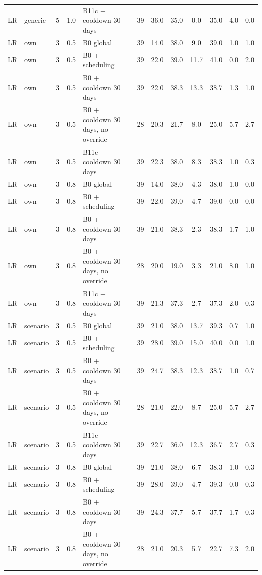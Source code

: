 \documentclass[10pt,onecolumn,letterpaper]{article}
\begin{document}
\begin{longtable}{lllllccccccc}
LR & generic & 5 & 1.0 & B11c + cooldown 30 days & 39 & 36.0 & 35.0 & 0.0 & 35.0 & 4.0 & 0.0 \\
LR & own & 3 & 0.5 & B0 global & 39 & 14.0 & 38.0 & 9.0 & 39.0 & 1.0 & 1.0 \\
LR & own & 3 & 0.5 & B0 + scheduling & 39 & 22.0 & 39.0 & 11.7 & 41.0 & 0.0 & 2.0 \\
LR & own & 3 & 0.5 & B0 + cooldown 30 days & 39 & 22.0 & 38.3 & 13.3 & 38.7 & 1.3 & 1.0 \\
LR & own & 3 & 0.5 & B0 + cooldown 30 days, no override & 28 & 20.3 & 21.7 & 8.0 & 25.0 & 5.7 & 2.7 \\
LR & own & 3 & 0.5 & B11c + cooldown 30 days & 39 & 22.3 & 38.0 & 8.3 & 38.3 & 1.0 & 0.3 \\
LR & own & 3 & 0.8 & B0 global & 39 & 14.0 & 38.0 & 4.3 & 38.0 & 1.0 & 0.0 \\
LR & own & 3 & 0.8 & B0 + scheduling & 39 & 22.0 & 39.0 & 4.7 & 39.0 & 0.0 & 0.0 \\
LR & own & 3 & 0.8 & B0 + cooldown 30 days & 39 & 21.0 & 38.3 & 2.3 & 38.3 & 1.7 & 1.0 \\
LR & own & 3 & 0.8 & B0 + cooldown 30 days, no override & 28 & 20.0 & 19.0 & 3.3 & 21.0 & 8.0 & 1.0 \\
LR & own & 3 & 0.8 & B11c + cooldown 30 days & 39 & 21.3 & 37.3 & 2.7 & 37.3 & 2.0 & 0.3 \\
LR & scenario & 3 & 0.5 & B0 global & 39 & 21.0 & 38.0 & 13.7 & 39.3 & 0.7 & 1.0 \\
LR & scenario & 3 & 0.5 & B0 + scheduling & 39 & 28.0 & 39.0 & 15.0 & 40.0 & 0.0 & 1.0 \\
LR & scenario & 3 & 0.5 & B0 + cooldown 30 days & 39 & 24.7 & 38.3 & 12.3 & 38.7 & 1.0 & 0.7 \\
LR & scenario & 3 & 0.5 & B0 + cooldown 30 days, no override & 28 & 21.0 & 22.0 & 8.7 & 25.0 & 5.7 & 2.7 \\
LR & scenario & 3 & 0.5 & B11c + cooldown 30 days & 39 & 22.7 & 36.0 & 12.3 & 36.7 & 2.7 & 0.3 \\
LR & scenario & 3 & 0.8 & B0 global & 39 & 21.0 & 38.0 & 6.7 & 38.3 & 1.0 & 0.3 \\
LR & scenario & 3 & 0.8 & B0 + scheduling & 39 & 28.0 & 39.0 & 4.7 & 39.3 & 0.0 & 0.3 \\
LR & scenario & 3 & 0.8 & B0 + cooldown 30 days & 39 & 24.3 & 37.7 & 5.7 & 37.7 & 1.7 & 0.3 \\
LR & scenario & 3 & 0.8 & B0 + cooldown 30 days, no override & 28 & 21.0 & 20.3 & 5.7 & 22.7 & 7.3 & 2.0 \\

\end{longtable}
\end{document}
